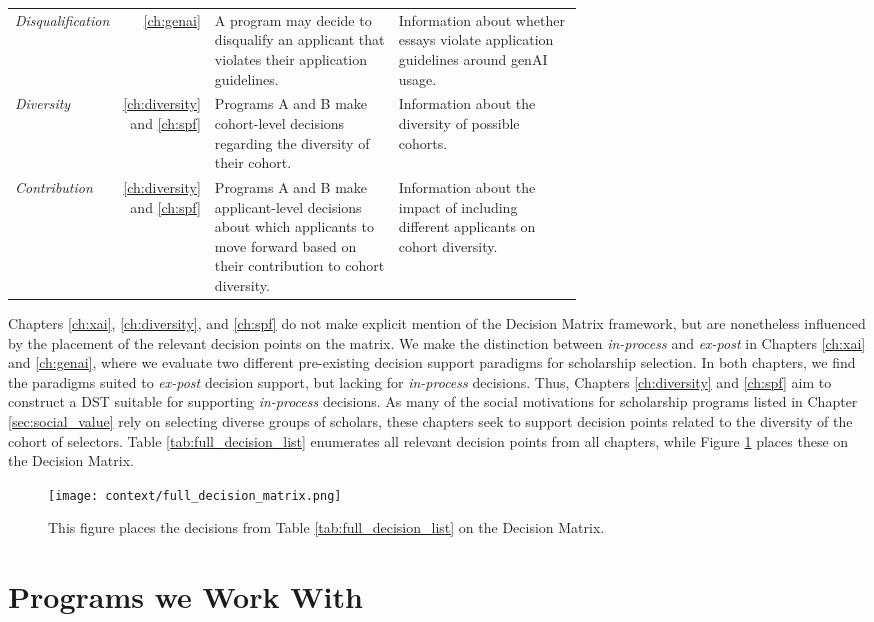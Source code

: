\begin{table}[htbp]
\begin{tabular}{l r p{0.33\linewidth}p{0.33\linewidth}}
      \emph{Disqualification} & \ref{ch:genai} & A program may decide to disqualify an applicant that violates their application guidelines. & Information about whether essays violate application guidelines around genAI usage. \\
      \emph{Diversity} & \ref{ch:diversity} and \ref{ch:spf} & Programs A and B make cohort-level decisions regarding the diversity of their cohort. & Information about the diversity of possible cohorts. \\
      \emph{Contribution} & \ref{ch:diversity} and \ref{ch:spf} & Programs A and B make applicant-level decisions about which applicants to move forward based on their contribution to cohort diversity. & Information about the impact of including different applicants on cohort diversity. \\
      \bottomrule
  \end{tabular}
\end{table}

Chapters \ref{ch:xai}, \ref{ch:diversity}, and \ref{ch:spf} do not make explicit mention of the Decision Matrix framework, but are nonetheless influenced by the placement of the relevant decision points on the matrix. We make the distinction between \emph{in-process} and \emph{ex-post} in Chapters \ref{ch:xai} and \ref{ch:genai}, where we evaluate two different pre-existing decision support paradigms for scholarship selection. In both chapters, we find the paradigms suited to \emph{ex-post} decision support, but lacking for \emph{in-process} decisions. Thus, Chapters \ref{ch:diversity} and \ref{ch:spf} aim to construct a DST suitable for supporting \emph{in-process} decisions. As many of the social motivations for scholarship programs listed in Chapter \ref{sec:social_value} rely on selecting diverse groups of scholars, these chapters seek to support decision points related to the diversity of the cohort of selectors. Table \ref{tab:full_decision_list} enumerates all relevant decision points from all chapters, while Figure \ref{fig:full_decision_matrix} places these on the Decision Matrix.

\begin{figure}[htbp]
  \centering
  \texttt{[image: context/full\_decision\_matrix.png]}
  \caption{This figure places the decisions from Table \ref{tab:full_decision_list} on the Decision Matrix.}
  \label{fig:full_decision_matrix}
\end{figure}

\section{Programs we Work With}\label{sec:programs}
